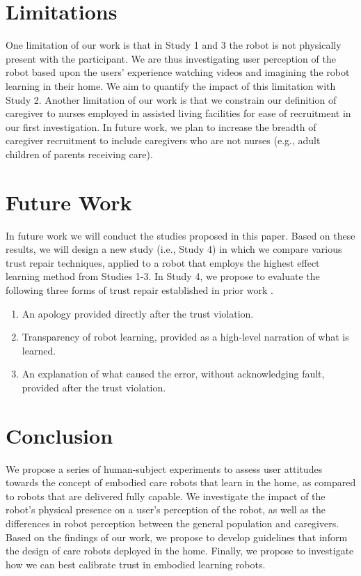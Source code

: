 \documentclass[letterpaper]{article} %
\begin{document}
\section{Limitations}
\label{sec:limitations}
One limitation of our work is that in Study 1 and 3 the robot is not physically present with the participant. We are thus investigating user perception of the robot based upon the users' experience watching videos and imagining the robot learning in their home. We aim to quantify the impact of this limitation with Study 2.  Another limitation of our work is that we constrain our definition of caregiver to nurses employed in assisted living facilities for ease of recruitment in our first investigation. In future work, we plan to increase the breadth of caregiver recruitment to include caregivers who are not nurses (e.g., adult children of parents receiving care). %


\section{Future Work}
\label{sec:futurework}
In future work we will conduct the studies proposed in this paper. Based on these results, we will design a new study (i.e., Study 4) in which we compare various trust repair techniques, applied to a robot that employs the highest effect learning method from Studies 1-3. In Study 4, we propose to evaluate the following three forms of trust repair established in prior work \cite{de_visser_towards_2020, baker_toward_2018, robinette_timing_2015, kim_repairing_2013}.

\begin{enumerate}
\item An apology provided directly after the trust violation.
\item Transparency of robot learning, provided as a high-level narration of what is learned.
\item An explanation of what caused the error, without acknowledging fault, provided after the trust violation.
\end{enumerate}

\section{Conclusion}
\label{sec:conclusion}
We propose a series of human-subject experiments to assess user attitudes towards the concept of embodied care robots that learn in the home, as compared to robots that are delivered fully capable. We investigate the impact of the robot's physical presence on a user's perception of the robot, as well as the differences in robot perception between the general population and caregivers. Based on the findings of our work, we propose to develop guidelines that inform the design of care robots deployed in the home. Finally, we propose to investigate how we can best calibrate trust in embodied learning robots.
\end{document}
